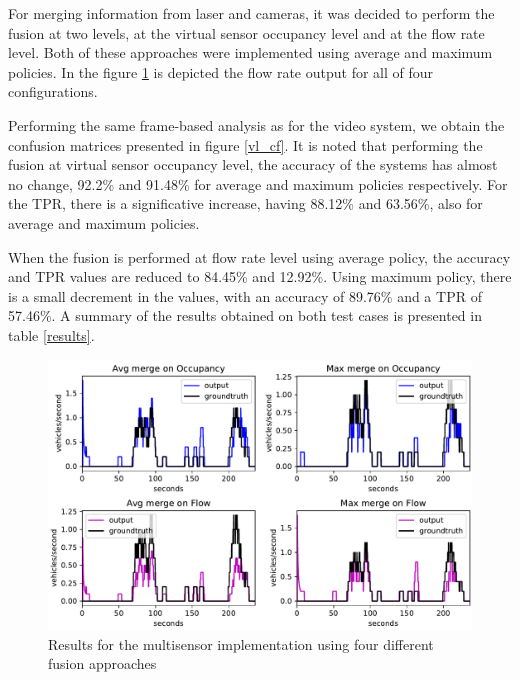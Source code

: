 For merging information from laser and cameras, it was decided to perform the fusion at two levels, at the virtual sensor occupancy level and at the flow rate level. Both of these approaches were implemented using average and maximum policies. In the figure \ref{vl_res} is depicted the flow rate output for all of four configurations.

Performing the same frame-based analysis as for the video system, we obtain the confusion matrices presented in figure \ref{vl_cf}. It is noted that performing the fusion at virtual sensor occupancy level, the accuracy of the systems has almost no change, 92.2\% and 91.48\% for average and maximum policies respectively. For the TPR, there is a significative increase, having 88.12\% and 63.56\%, also for average and maximum policies.

When the fusion is performed at flow rate level using average policy, the accuracy and TPR values are reduced to 84.45\% and 12.92\%. Using maximum policy, there is a small decrement in the values, with an accuracy of 89.76\% and a TPR of 57.46\%. A summary of the results obtained on both test cases is presented in table \ref{results}.


\begin{figure}[htb!]
\centering
\includegraphics[scale=0.5]{fig/4/vl_res.pdf}
\caption{Results for the multisensor implementation using four different fusion approaches}
\label{vl_res}
\end{figure}

